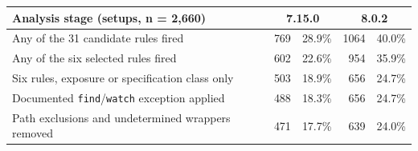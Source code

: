 \begin{tabular}{@{}lrrrr@{}}
\toprule
Analysis stage (setups, n = 2,660) & \multicolumn{2}{c}{7.15.0} & \multicolumn{2}{c}{8.0.2} \\
\midrule
Any of the 31 candidate rules fired & 769 & 28.9\% & 1064 & 40.0\% \\
Any of the six selected rules fired & 602 & 22.6\% & 954 & 35.9\% \\
Six rules, exposure or specification class only & 503 & 18.9\% & 656 & 24.7\% \\
Documented \texttt{find}/\texttt{watch} exception applied & 488 & 18.3\% & 656 & 24.7\% \\
Path exclusions and undetermined wrappers removed & 471 & 17.7\% & 639 & 24.0\% \\
\bottomrule
\end{tabular}
